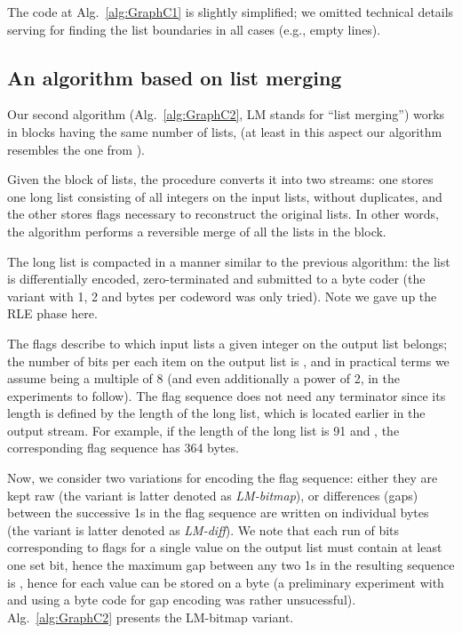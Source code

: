 \documentclass[envcountsame]{llncs}
\begin{document}
The code at Alg.~\ref{alg:GraphC1} is slightly simplified; we omitted technical details 
serving for finding the list boundaries in all cases (e.g., empty lines).


\subsection{An algorithm based on list merging}
\label{sec:sa}


Our second algorithm (Alg.~\ref{alg:GraphC2}, LM stands for ``list merging'') 
works in blocks having the same number of lists,  (at least in this aspect 
our algorithm resembles the one from \cite{DBLP:conf/dcc/AnhM10}).

Given the block of  lists, the procedure converts it into two streams: one stores 
one long list consisting of all integers on the  input lists, without duplicates, 
and the other stores flags necessary to reconstruct the original lists.
In other words, the algorithm performs a reversible merge of all the lists 
in the block.

The long list is compacted in a manner similar to the previous algorithm:
the list is differentially encoded, zero-terminated and submitted to a byte coder 
(the variant with 1, 2 and  bytes per codeword was only tried). Note we gave up 
the RLE phase here.

The flags describe to which input lists a given integer on the output list belongs; 
the number of bits per each item on the output list is , and in practical terms 
we assume  being a multiple of 8 (and even additionally a power of 2, in the 
experiments to follow). 
The flag sequence does not need any terminator since its length is defined by the 
length of the long list, which is located earlier in the output stream.
For example, if the length of the long list is 91 and , the corresponding 
flag sequence has 364 bytes.

Now, we consider two variations for encoding the flag sequence:
either they are kept raw (the variant is latter denoted as {\em LM-bitmap}), 
or differences (gaps) between the successive 1s in the flag sequence are written 
on individual bytes (the variant is latter denoted as {\em LM-diff}).
We note that each run of  bits corresponding to flags for a single value on the 
output list must contain at least one set bit, hence the maximum gap 
between any two 1s in the resulting sequence is , hence for  
each value can be stored on a byte 
(a preliminary experiment with  and using a byte code for gap encoding 
was rather unsucessful).
Alg.~\ref{alg:GraphC2} presents the LM-bitmap variant.
\end{document}
